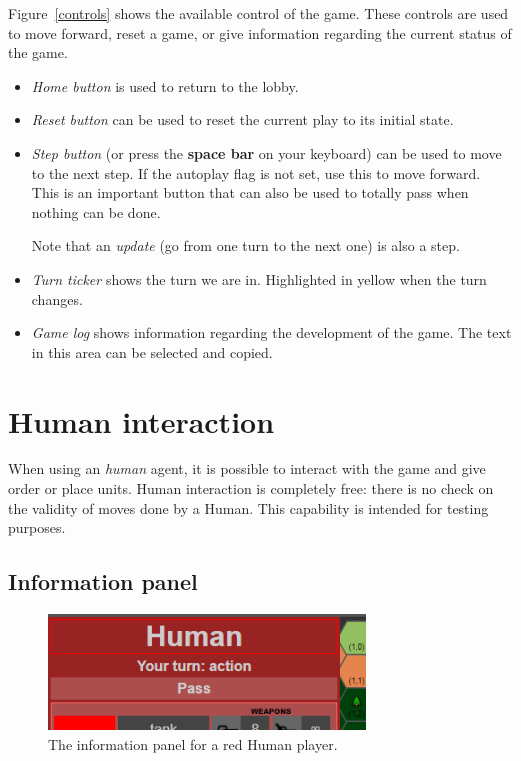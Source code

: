 \documentclass[a4paper]{article}
\begin{document}
	Figure~\ref{controls} shows the available control of the game. These controls are used to move forward, reset a game, or give information regarding the current status of the game.

	\begin{itemize}
		\item \textit{Home button} is used to return to the lobby.
		
		\item \textit{Reset button} can be used to reset the current play to its initial state.
		
		\item \textit{Step button} (or press the \textbf{space bar} on your keyboard) can be used to move to the next step. If the autoplay flag is not set, use this to move forward. This is an important button that can also be used to totally pass when nothing can be done.
		
		Note that an \textit{update} (go from one turn to the next one) is also a step.
		
		\item \textit{Turn ticker} shows the turn we are in. Highlighted in yellow when the turn changes.
		
		\item \textit{Game log} shows information regarding the development of the game. The text in this area can be selected and copied.
	
	\end{itemize}


	\section{Human interaction}

	When using an \textit{human} agent, it is possible to interact with the game and give order or place units. Human interaction is completely free: there is no check on the validity of moves done by a Human. This capability is intended for testing purposes.

	\subsection{Information panel}

	\begin{figure}[ht!]
		\centering
		\includegraphics[width=0.75\textwidth]{pass.png}
		\caption{The information panel for a red Human player.}
		\label{infos}
	\end{figure}
\end{document}
